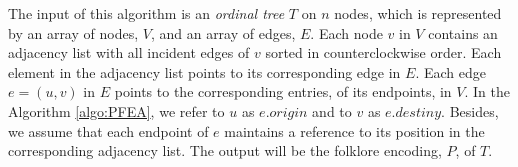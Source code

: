%  	
\normalsize

The input of this algorithm is an \emph{ordinal tree} $T$ on $n$ nodes, which is represented by an array of nodes, $V$, and an array of edges, $E$. Each node $v$ in $V$ contains an adjacency list with all incident edges of $v$ sorted in counterclockwise order. Each element in the adjacency list points to its corresponding edge in $E$. Each edge $e=(u,v)$ in $E$ points to the corresponding entries, of its endpoints, in $V$. In the Algorithm \ref{algo:PFEA}, we refer to $u$ as $e.origin$ and to $v$ as $e.destiny$. Besides, we assume that each endpoint of $e$ maintains a reference to its position in the corresponding adjacency list. The output will be the folklore encoding, $P$, of $T$.

